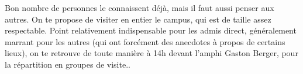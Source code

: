 Bon nombre de personnes le connaissent déjà, mais il faut aussi penser aux
autres. On te propose de visiter en entier le campus, qui est de taille assez
respectable. Point relativement indispensable pour les admis direct,
généralement marrant pour les autres (qui ont forcément des anecdotes à
propos de certains lieux), on te retrouve de toute manière à 14h
devant l'amphi Gaston Berger, pour la répartition en groupes de visite..

